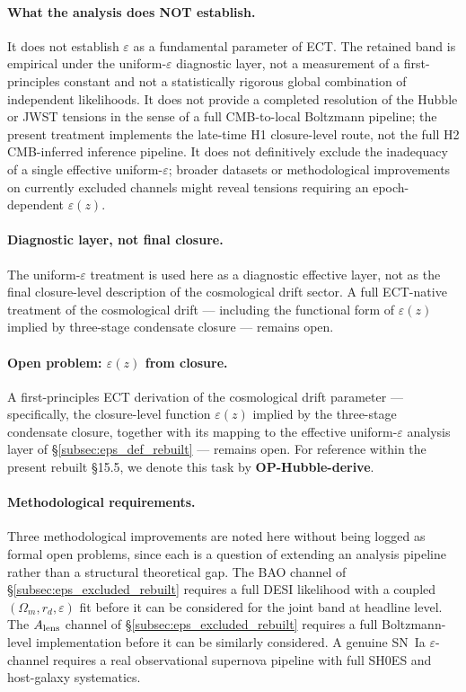 \paragraph{What the analysis does NOT establish.}
It does not establish $\varepsilon$ as a fundamental parameter of
ECT. The retained band is empirical under the uniform-$\varepsilon$
diagnostic layer, not a measurement of a first-principles constant
and not a statistically rigorous global combination of independent
likelihoods. It does not provide a completed resolution of the
Hubble or JWST tensions in the sense of a full CMB-to-local Boltzmann
pipeline; the present treatment implements the late-time H1
closure-level route, not the full H2 CMB-inferred inference pipeline.
It does not definitively exclude the inadequacy of a single effective
uniform-$\varepsilon$; broader datasets or methodological improvements
on currently excluded channels might reveal tensions requiring an
epoch-dependent $\varepsilon(z)$.

\paragraph{Diagnostic layer, not final closure.}
The uniform-$\varepsilon$ treatment is used here as a diagnostic
effective layer, not as the final closure-level description of the
cosmological drift sector. A full ECT-native treatment of the
cosmological drift --- including the functional form of
$\varepsilon(z)$ implied by three-stage condensate closure ---
remains open.

\paragraph{Open problem: $\varepsilon(z)$ from closure.}
\label{op:hubble_derive}
A first-principles ECT derivation of the cosmological drift
parameter --- specifically, the closure-level function
$\varepsilon(z)$ implied by the three-stage condensate closure,
together with its mapping to the effective uniform-$\varepsilon$
analysis layer of \S\ref{subsec:eps_def_rebuilt} --- remains open.
For reference within the present rebuilt \S15.5, we denote this task
by \textbf{OP-Hubble-derive}.

\paragraph{Methodological requirements.}
Three methodological improvements are noted here without being logged
as formal open problems, since each is a question of extending an
analysis pipeline rather than a structural theoretical gap. The BAO
channel of \S\ref{subsec:eps_excluded_rebuilt} requires a full DESI
likelihood with a coupled $(\Omega_m, r_d, \varepsilon)$ fit before it
can be considered for the joint band at headline level. The
$A_{\rm lens}$ channel of \S\ref{subsec:eps_excluded_rebuilt} requires
a full Boltzmann-level implementation before it can be similarly
considered. A genuine SN~Ia $\varepsilon$-channel requires a real
observational supernova pipeline with full SH0ES and host-galaxy
systematics.

